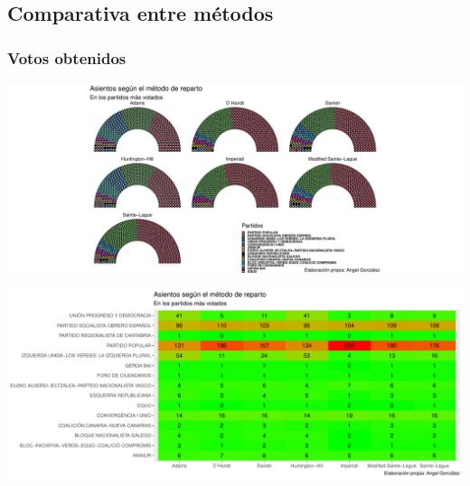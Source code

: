 \documentclass[12pt,a4paper,]{book}
\numberwithin{dummy}{section}
\theoremstyle{ocrenumbox}
\theoremstyle{blacknumex}
\theoremstyle{blacknumbox}
\theoremstyle{ocrenum}
\theoremstyle{ocrenum}
\begin{document}
\hypertarget{comparativa-entre-muxe9todos-10}{%
\subsection{Comparativa entre
métodos}\label{comparativa-entre-muxe9todos-10}}

\hypertarget{votos-obtenidos-10}{%
\subsubsection{Votos obtenidos}\label{votos-obtenidos-10}}

\begin{center}\includegraphics[width=0.95\linewidth]{figurasR/unnamed-chunk-101-1} \end{center}

\begin{center}\includegraphics[width=0.95\linewidth]{figurasR/unnamed-chunk-101-2} \end{center}
\end{document}
